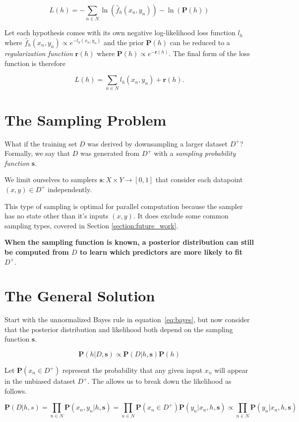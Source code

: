 \documentclass[twoside]{article}
\begin{document}
\[L(h)=-\sum_{n \in N} \ln(\hat{f}_h(x_n,y_n))-\ln(\mathbf{P}(h))\]

Let each hypothesis comes with its own negative log-likelihood loss function \(l_h\) where \(\hat{f}_h(x_n,y_n)\propto e^{-l_h(x_n,y_n)}\) and the prior \(\mathbf{P}(h)\) can be reduced to a \textit{regularization function} \(\mathbf{r}(h)\) where \(\mathbf{P}(h)\propto e^{-\mathbf{r}(h)}\). The final form of the loss function is therefore

\[L(h)=\sum_{n \in N} l_h(x_n,y_n)+\mathbf{r}(h).\]

\section{The Sampling Problem}
\label{section:problem}

What if the training set \(D\) was derived by downsampling a larger dataset \(D^+\)? Formally, we say that \(D\) was generated from \(D^+\) with a \textit{sampling probability function} \(\mathbf{s}\).

We limit ourselves to samplers \(\mathbf{s}: X \times Y \rightarrow \left [ 0, 1\right ]\) that consider each datapoint \((x, y) \in D^+\) independently.

This type of sampling is optimal for parallel computation because the sampler has no state other than it's inputs \((x, y)\). It does exclude some common sampling types, covered in Section \ref{section:future_work}.

\textbf{When the sampling function is known, a posterior distribution can still be computed from \(D\) to learn which predictors are more likely to fit \(D^+\)}.

\section{The General Solution}
\label{section:solution}

Start with the unnormalized Bayes rule in equation~\eqref{eq:bayes}, but now consider that the posterior distribution and likelihood both depend on the sampling function \(\mathbf{s}\).

\[\mathbf{P}(h|D,\mathbf{s})\propto\mathbf{P}(D|h,\mathbf{s})\mathbf{P}(h)\]

Let \(\mathbf{P}(x_n \in D^+)\) represent the probability that any given input \(x_n\) will appear in the unbiased dataset \(D^+\). The allows us to break down the likelihood as follows.

\[\mathbf{P}(D|h,s)=\prod_{n \in N} \mathbf{P}(x_n,y_n|h,\mathbf{s})=\prod_{n \in N} \mathbf{P}(x_n \in D^+)\mathbf{P}(y_n|x_n,h,\mathbf{s})\propto\prod_{n \in N}\mathbf{P}(y_n|x_n,h,\mathbf{s})\]
\end{document}
